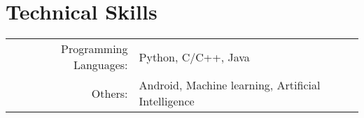 \section{Technical Skills}
\renewcommand{\arraystretch}{1}%
\begin{tabular}{rl}

Programming Languages: &  Python, C/C++, Java\\
Others: & Android, Machine learning, Artificial Intelligence \\
\end{tabular}
\vspace{5pt}

